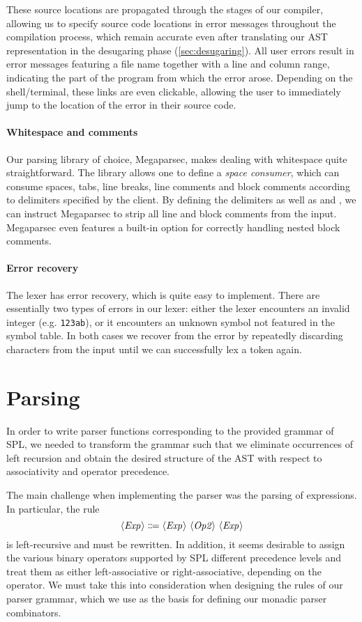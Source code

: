 These source locations are propagated through the stages of our compiler,
allowing us to specify source code locations in error messages throughout the
compilation process, which remain accurate even after translating our AST
representation in the desugaring phase (\cref{sec:desugaring}).
%
All user errors result in error messages featuring a file name together with a
line and column range, indicating the part of the program from which the error
arose. Depending on the shell/terminal, these links are even clickable, allowing
the user to immediately jump to the location of the error in their source code.

\paragraph{Whitespace and comments}
Our parsing library of choice, Megaparsec, makes dealing with whitespace quite
straightforward. The library allows one to define a \emph{space consumer}, which
can consume spaces, tabs, line breaks, line comments and block comments
according to delimiters specified by the client.
By defining the delimiters \code{//} as well as \code{/*} and \code{*/}, we can
instruct Megaparsec to strip all line and block comments from the input.
Megaparsec even features a built-in option for correctly
handling nested block comments.

\paragraph{Error recovery}
The lexer has error recovery, which is quite easy to implement.
There are essentially two types of errors in our lexer:
either the lexer encounters an invalid integer (e.g. \verb|123ab|),
or it encounters an unknown symbol not featured in the symbol table.
In both cases we recover from the error by repeatedly discarding characters from
the input until we can successfully lex a token again.


\section{Parsing}
In order to write parser functions corresponding to the provided grammar of SPL,
we needed to transform the grammar such that we eliminate occurrences of left
recursion and obtain the desired structure of the AST with respect to
associativity and operator precedence.

The main challenge when implementing the parser was the parsing of expressions.
In particular, the rule
\[ \NT{Exp} \Coloneqq \NT{Exp}\ \NT{Op2}\ \NT{Exp} \]
is left-recursive and must be rewritten.
In addition, it seems desirable to assign the various binary operators supported
by SPL different precedence levels and treat them as either left-associative or
right-associative, depending on the operator.
We must take this into consideration when designing the rules of our parser
grammar, which we use as the basis for defining our monadic parser combinators.

